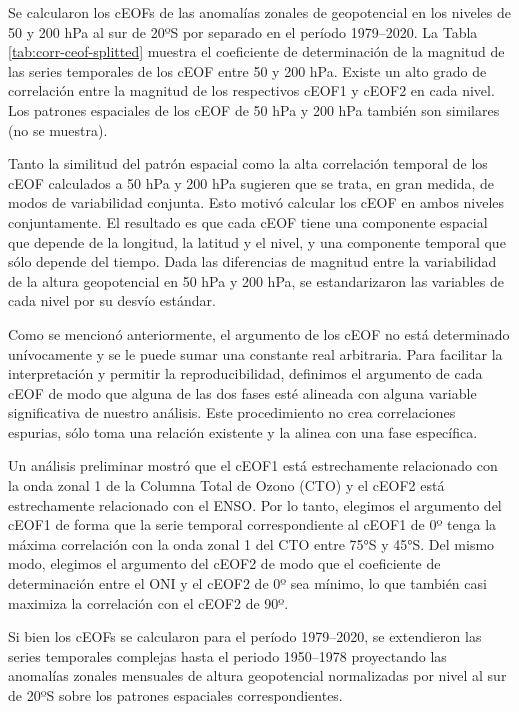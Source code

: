 \documentclass[12pt,oneside,a4paper]{reedthesis}
\begin{document}
Se calcularon los cEOFs de las anomalías zonales de geopotencial en los niveles de 50 y 200 hPa al sur de 20ºS por separado en el período 1979--2020.
La Tabla \ref{tab:corr-ceof-splitted} muestra el coeficiente de determinación de la magnitud de las series temporales de los cEOF entre 50 y 200 hPa.
Existe un alto grado de correlación entre la magnitud de los respectivos cEOF1 y cEOF2 en cada nivel.
Los patrones espaciales de los cEOF de 50 hPa y 200 hPa también son similares (no se muestra).

Tanto la similitud del patrón espacial como la alta correlación temporal de los cEOF calculados a 50 hPa y 200 hPa sugieren que se trata, en gran medida, de modos de variabilidad conjunta.
Esto motivó calcular los cEOF en ambos niveles conjuntamente.
El resultado es que cada cEOF tiene una componente espacial que depende de la longitud, la latitud y el nivel, y una componente temporal que sólo depende del tiempo.
Dada las diferencias de magnitud entre la variabilidad de la altura geopotencial en 50 hPa y 200 hPa, se estandarizaron las variables de cada nivel por su desvío estándar.

Como se mencionó anteriormente, el argumento de los cEOF no está determinado unívocamente y se le puede sumar una constante real arbitraria.
Para facilitar la interpretación y permitir la reproducibilidad, definimos el argumento de cada cEOF de modo que alguna de las dos fases esté alineada con alguna variable significativa de nuestro análisis.
Este procedimiento no crea correlaciones espurias, sólo toma una relación existente y la alinea con una fase específica.

Un análisis preliminar mostró que el cEOF1 está estrechamente relacionado con la onda zonal 1 de la Columna Total de Ozono (CTO) y el cEOF2 está estrechamente relacionado con el ENSO.
Por lo tanto, elegimos el argumento del cEOF1 de forma que la serie temporal correspondiente al cEOF1 de 0º tenga la máxima correlación con la onda zonal 1 del CTO entre 75°S y 45°S.
Del mismo modo, elegimos el argumento del cEOF2 de modo que el coeficiente de determinación entre el ONI y el cEOF2 de 0º sea mínimo, lo que también casi maximiza la correlación con el cEOF2 de 90º.

Si bien los cEOFs se calcularon para el período 1979--2020, se extendieron las series temporales complejas hasta el periodo 1950--1978 proyectando las anomalías zonales mensuales de altura geopotencial normalizadas por nivel al sur de 20ºS sobre los patrones espaciales correspondientes.
\end{document}
